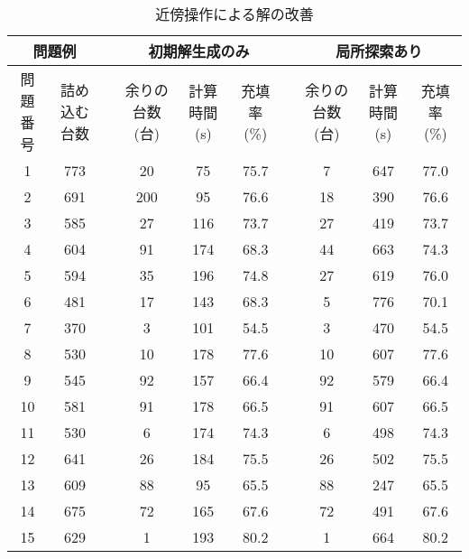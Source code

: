 \begin{landscape}    
\begin{table}[p]
    \caption{近傍操作による解の改善}
    \label{review-local}
    \begin{tabular}{cccccclccc}
    \hline
    \multicolumn{2}{c}{問題例} &  & \multicolumn{3}{c}{初期解生成のみ}     &  & \multicolumn{3}{c}{局所探索あり}      \\
    \hline
    問題番号      & 詰め込む台数      &  & 余りの台数 (台) & 計算時間 (s) & 充填率 (\%) &  & 余りの台数 (台) & 計算時間 (s) & 充填率 (\%) \\
    \hline
    1         & 773         &  & 20        & 75       & 75.7     &  & 7         & 647      & 77.0     \\
    2         & 691         &  & 200       & 95       & 76.6     &  & 18        & 390      & 76.6     \\
    3         & 585         &  & 27        & 116      & 73.7     &  & 27        & 419      & 73.7     \\
    4         & 604         &  & 91        & 174      & 68.3     &  & 44        & 663      & 74.3     \\
    5         & 594         &  & 35        & 196      & 74.8     &  & 27        & 619      & 76.0     \\
    6         & 481         &  & 17        & 143      & 68.3     &  & 5         & 776      & 70.1     \\
    7         & 370         &  & 3         & 101      & 54.5     &  & 3         & 470      & 54.5     \\
    8         & 530         &  & 10        & 178      & 77.6     &  & 10        & 607      & 77.6     \\
    9         & 545         &  & 92        & 157      & 66.4     &  & 92        & 579      & 66.4     \\
    10        & 581         &  & 91        & 178      & 66.5     &  & 91        & 607      & 66.5     \\
    11        & 530         &  & 6         & 174      & 74.3     &  & 6         & 498      & 74.3     \\
    12        & 641         &  & 26        & 184      & 75.5     &  & 26        & 502      & 75.5     \\
    13        & 609         &  & 88        & 95       & 65.5     &  & 88        & 247      & 65.5     \\
    14        & 675         &  & 72        & 165      & 67.6     &  & 72        & 491      & 67.6     \\
    15        & 629         &  & 1         & 193      & 80.2     &  & 1         & 664      & 80.2     \\
    \hline
    \end{tabular}
\end{table}
\end{landscape}